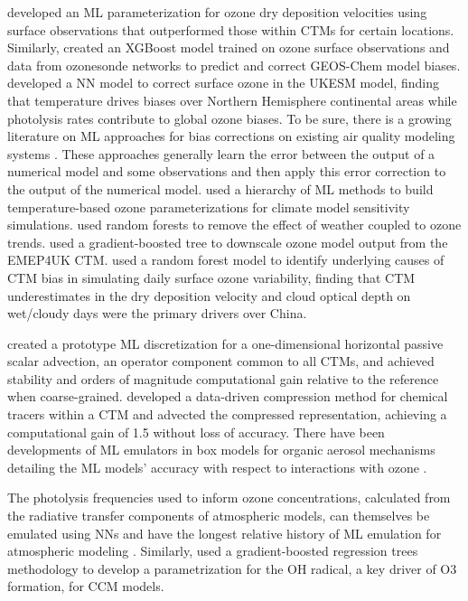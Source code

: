\documentclass[gmd, manuscript]{copernicus}
\begin{document}
\citet{silva_deep_2019} developed an ML parameterization for ozone dry deposition velocities using surface observations that outperformed those within CTMs for certain locations. Similarly,  created an XGBoost model trained on ozone surface observations and data from ozonesonde networks to predict and correct GEOS-Chem model biases. \citet{liu_correcting_2022} developed a NN model to correct surface ozone in the UKESM model, finding that temperature drives biases over Northern Hemisphere continental areas while photolysis rates contribute to global ozone biases. To be sure, there is a growing literature on ML approaches for bias corrections on existing air quality modeling systems \citep{Neal2014, Borrego2011, Silibello2015}. These approaches generally learn the error between the output of a numerical model and some observations and then apply this error correction to the output of the numerical model. \citet{nowack_using_2018} used a hierarchy of ML methods to build temperature-based ozone parameterizations for climate model sensitivity simulations. \citet{colombi_why_2023} used random forests to remove the effect of weather coupled to ozone trends. \citet{Gouldsbrough2024} used a gradient-boosted tree to downscale ozone model output from the EMEP4UK CTM. \citet{ye_diagnosing_2022} used a random forest model to identify underlying causes of CTM bias in simulating daily surface ozone variability, finding that CTM underestimates in the dry deposition velocity and cloud optical depth on wet/cloudy days were the primary drivers over China. 
 
\citet{park_learned_2023} created a prototype ML discretization for a one-dimensional horizontal passive scalar advection, an operator component common to all CTMs, and achieved stability and orders of magnitude computational gain relative to the reference when coarse-grained. \citet{sturm_advecting_2023} developed a data-driven compression method for chemical tracers within a CTM and advected the compressed representation, achieving a computational gain of 1.5 without loss of accuracy. There have been developments of ML emulators in box models for organic aerosol mechanisms detailing the ML models’ accuracy with respect to interactions with ozone \citep{mouchel-vallon_toward_2023, schreck_neural_2022}.
 
The photolysis frequencies used to inform ozone concentrations, calculated from the radiative transfer components of atmospheric models, can themselves be emulated using NNs  and have the longest relative history of ML emulation for atmospheric modeling \citep{krasnopolsky_new_2005,krasnopolsky_decadal_2008}. Similarly, \citet{anderson_machine_2022} used a gradient-boosted regression trees methodology to develop a parametrization for the OH radical, a key driver of O3 formation, for CCM models. 
\end{document}

